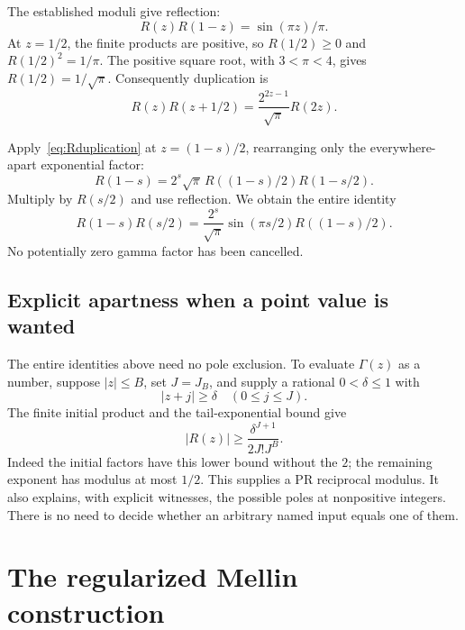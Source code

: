 \documentclass[11pt,letterpaper]{article}
\numberwithin{equation}{section}
\theoremstyle{definition}
\newcommand{\gamrec}{R}
\begin{document}
The established moduli give reflection:
\begin{equation}
       \gamrec(z)\gamrec(1-z)=\sin(\pi z)/\pi.              \label{eq:Rreflection}
\end{equation}
At \(z=1/2\), the finite products are positive, so
\(\gamrec(1/2)\ge0\) and
\(\gamrec(1/2)^2=1/\pi\).
The positive square root, with \(3<\pi<4\), gives
\(\gamrec(1/2)=1/\sqrt\pi\). Consequently duplication is
\begin{equation}
 \gamrec(z)\gamrec(z+1/2)
             =\frac{2^{2z-1}}{\sqrt\pi}\gamrec(2z).
 \label{eq:Rduplication}
\end{equation}

Apply~\eqref{eq:Rduplication} at \(z=(1-s)/2\), rearranging only
the everywhere-apart exponential factor:
\[
 \gamrec(1-s)=2^s\sqrt\pi\,
                  \gamrec((1-s)/2)\gamrec(1-s/2).
\]
Multiply by \(\gamrec(s/2)\) and use reflection.
We obtain the entire identity
\begin{equation}
 \boxed{\gamrec(1-s)\gamrec(s/2)
 =\frac{2^s}{\sqrt\pi}\sin(\pi s/2)\gamrec((1-s)/2).}
 \label{eq:gammafactor}
\end{equation}
No potentially zero gamma factor has been cancelled.

\subsection{Explicit apartness when a point value is wanted}

The entire identities above need no pole exclusion. To evaluate
\(\Gamma(z)\) as a number, suppose \(|z|\le B\), set \(J=J_B\), and
supply a rational \(0<\delta\le1\) with
\[
                   |z+j|\ge\delta\quad(0\le j\le J).
\]
The finite initial product and the tail-exponential bound give
\begin{equation}
                |\gamrec(z)|\ge
                  \frac{\delta^{J+1}}{2J!J^B}.             \label{eq:Rlower}
\end{equation}
Indeed the initial factors have this lower bound without the \(2\);
the remaining exponent has modulus at most \(1/2\).
This supplies a PR reciprocal modulus. It also explains, with
explicit witnesses, the possible poles at nonpositive integers.
There is no need to decide whether an arbitrary named input equals
one of them.

\section{The regularized Mellin construction}\label{sec:mellin}
\end{document}
